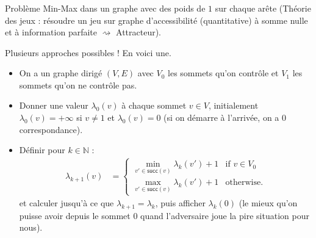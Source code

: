 \usetikzlibrary{overlay-beamer-styles}

\begin{frame}
    \frametitle{\problemtitle}
     \begin{block}{Problème}
        Min-Max dans un graphe avec des poids de $1$ sur chaque arête (Théorie des jeux : résoudre un jeu sur graphe d'accessibilité (quantitative) à somme nulle et à information parfaite $\rightsquigarrow$ Attracteur).
    \end{block}
    Plusieurs approches possibles ! En voici une.
    \pause
    \begin{itemize}
       \item<+-> On a un graphe dirigé $(V,E)$ avec $V_0$ les sommets qu'on contrôle et $V_1$ les sommets qu'on ne contrôle pas.
       \item<+-> Donner une valeur $\lambda_0(v)$ à chaque sommet $v \in V$, initialement $\lambda_0(v) = +\infty$ si $v \neq 1$ et $\lambda_0(v) = 0$ (si on démarre à l'arrivée, on a 0 correspondance).
       \item<+-> Définir pour $k \in \mathbb{N}$ :
          \begin{align*}
          \lambda_{k+1}(v)&=\begin{cases}
              \underset{v'\in\mathsf{succ}(v)}{\min} \lambda_{k}(v')+1 &\text{if } v\in V_0\\
              \underset{v'\in\mathsf{succ}(v)}{\max} \lambda_{k}(v')+1 &\text{otherwise}.
          \end{cases}
          \end{align*}
          et calculer jusqu'à ce que $\lambda_{k+1} = \lambda_{k}$, puis afficher $\lambda_{k}(0)$ (le mieux qu'on puisse avoir depuis le sommet $0$ quand l'adversaire joue la pire situation pour nous).
     \end{itemize}
\end{frame}

